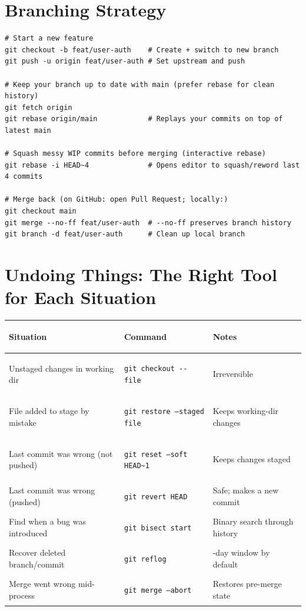 \documentclass[11pt, letterpaper]{article}
\begin{document}
\section*{Branching Strategy}

\begin{lstlisting}[style=shell, caption={Feature branch workflow}]
# Start a new feature
git checkout -b feat/user-auth    # Create + switch to new branch
git push -u origin feat/user-auth # Set upstream and push

# Keep your branch up to date with main (prefer rebase for clean history)
git fetch origin
git rebase origin/main            # Replays your commits on top of latest main

# Squash messy WIP commits before merging (interactive rebase)
git rebase -i HEAD~4              # Opens editor to squash/reword last 4 commits

# Merge back (on GitHub: open Pull Request; locally:)
git checkout main
git merge --no-ff feat/user-auth  # --no-ff preserves branch history
git branch -d feat/user-auth      # Clean up local branch
\end{lstlisting}

\section*{Undoing Things: The Right Tool for Each Situation}

\noindent
{\renewcommand{\arraystretch}{1.6}
\begin{tabularx}{\textwidth}{>{\raggedright\arraybackslash}p{5cm}
                              >{\bfseries\raggedright\arraybackslash}p{4cm}
                              >{\raggedright\arraybackslash}X}
\toprule
\rowcolor{tableheadergrey}
\textbf{Situation} & \textbf{Command} & \textbf{Notes} \\
\midrule
\rowcolor{rowGr} Unstaged changes in working dir & \texttt{git checkout -{}- file} & Irreversible \\
\rowcolor{rowA}  File added to stage by mistake  & \texttt{git restore --staged file} & Keeps working-dir changes \\
\rowcolor{rowGr} Last commit was wrong (not pushed) & \texttt{git reset --soft HEAD\textasciitilde1} & Keeps changes staged \\
\rowcolor{rowA}  Last commit was wrong (pushed) & \texttt{git revert HEAD} & Safe; makes a new commit \\
\rowcolor{rowGr} Find when a bug was introduced & \texttt{git bisect start} & Binary search through history \\
\rowcolor{rowA}  Recover deleted branch/commit & \texttt{git reflog} & 90-day window by default \\
\rowcolor{rowGr} Merge went wrong mid-process & \texttt{git merge --abort} & Restores pre-merge state \\
\bottomrule
\end{tabularx}}
\end{document}
